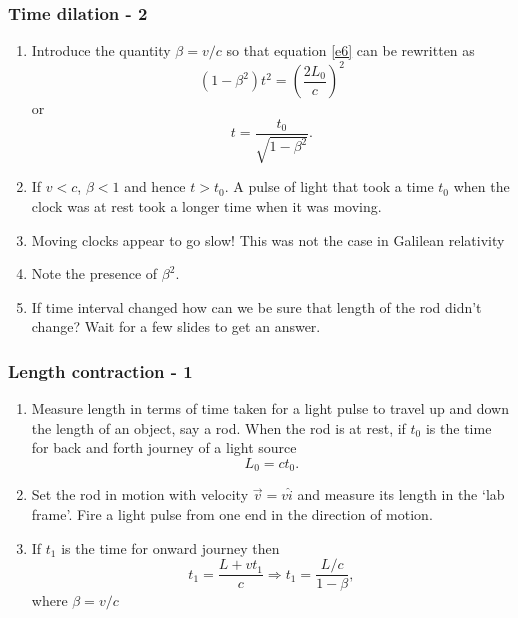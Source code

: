 \documentclass{beamer}
\begin{document}
\begin{frame}
\frametitle{Time dilation - 2}
\begin{enumerate}
\item Introduce the quantity $\beta = v/c$ so that equation \eqref{e6} can be
rewritten as
\[
(1 - \beta^2)t^2 = \left(\frac{2L_0}{c}\right)^2 
\]
or
\begin{equation}\label{e7}
t = \frac{t_0}{\sqrt{1 - \beta^2}}.
\end{equation}
\item If $v < c$, $\beta < 1$ and hence $t > t_0$. A pulse of light that took
 a time $t_0$ when the clock was at rest took a longer time when it was moving.
\item Moving clocks appear to go slow! This was not the case in Galilean
relativity
\item Note the presence of $\beta^2$.
\item If time interval changed how can we be sure that length of the rod didn't
change? Wait for a few slides to get an answer. 
\end{enumerate}
\end{frame}

\begin{frame}
\frametitle{Length contraction - 1}
\begin{enumerate}
\item Measure length in terms of time taken for a light pulse to travel up and
down the length of an object, say a rod. When the rod is at rest, if $t_0$ is
the time for back and forth journey of a light source 
\begin{equation}\label{e8}
L_0 = ct_0.
\end{equation}
\item Set the rod in motion with velocity $\vec{v} = v\hat{i}$ and measure its
length in the `lab frame'. Fire a light pulse from one end in the direction of
motion.
\item If $t_1$ is the time for onward journey then
\begin{equation}\label{e9}
t_1 = \frac{L + vt_1}{c} \Rightarrow t_1 = \frac{L/c}{1 - \beta},
\end{equation}
where $\beta = v/c$
\end{enumerate}
\end{frame}
\end{document}
